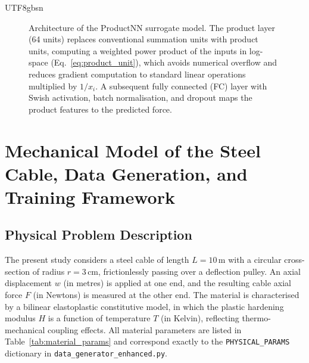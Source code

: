 \documentclass[a4paper,12pt]{report}
\begin{document}
\begin{CJK}{UTF8}{gbsn}
\begin{figure}[H]
\caption{Architecture of the ProductNN surrogate model. The product layer (64 units)
replaces conventional summation units with product units, computing a weighted power
product of the inputs in log-space (Eq.~\eqref{eq:product_unit}), which avoids
numerical overflow and reduces gradient computation to standard linear operations
multiplied by $1/x_i$. A subsequent fully connected (FC) layer with Swish activation,
batch normalisation, and dropout maps the product features to the predicted force.}
\label{fig:productnn}
\end{figure}

\chapter{Mechanical Model of the Steel Cable, Data Generation, and Training Framework}
\label{chap:model}

\section{Physical Problem Description}
\label{sec:physical_problem}

The present study considers a steel cable of length $L = 10$\,m with a circular cross-
section of radius $r = 3$\,cm, frictionlessly passing over a deflection pulley. An axial
displacement $w$ (in metres) is applied at one end, and the resulting cable axial force $F$
(in Newtons) is measured at the other end. The material is characterised by a bilinear
elastoplastic constitutive model, in which the plastic hardening modulus $H$ is a function
of temperature $T$ (in Kelvin), reflecting thermo-mechanical coupling effects. All
material parameters are listed in Table~\ref{tab:material_params} and correspond exactly
to the \texttt{PHYSICAL\_PARAMS} dictionary in \texttt{data\_generator\_enhanced.py}.


\end{CJK}
\end{document}
